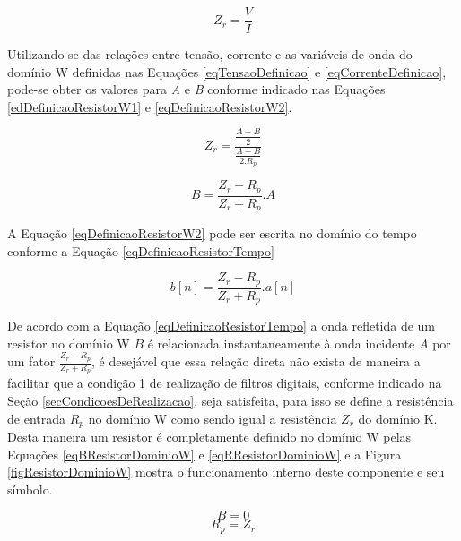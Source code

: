 	\begin{equation}
		\label{eqDefinicaoResistor}
		Z_r = \frac{V}{I}
	\end{equation}
	
	Utilizando-se das relações entre tensão, corrente e as variáveis de onda do domínio W definidas nas Equações \ref{eqTensaoDefinicao} e \ref{eqCorrenteDefinicao}, pode-se obter os valores para \textit{A} e \textit{B} conforme indicado nas Equações \ref{edDefinicaoResistorW1} e \ref{eqDefinicaoResistorW2}.
	
	\begin{equation}
		\label{edDefinicaoResistorW1}
		Z_r = \frac{\frac{A+B}{2}}{\frac{A-B}{2.R_p}}
	\end{equation}  
	
	\begin{equation}
		\label{eqDefinicaoResistorW2}
		B = \frac{Z_r-R_p}{Z_r+R_p}.A
	\end{equation}
	
	A Equação \ref{eqDefinicaoResistorW2} pode ser escrita no domínio do tempo conforme a Equação \ref{eqDefinicaoResistorTempo}
	
	\begin{equation}
		\label{eqDefinicaoResistorTempo}
		b[n] = \frac{Z_r-R_p}{Z_r+R_p}.a[n]
	\end{equation}
	
	De acordo com a Equação \ref{eqDefinicaoResistorTempo} a onda refletida de um resistor no domínio W $B$ é relacionada instantaneamente à onda incidente $A$ por um fator $\frac{Z_r-R_p}{Z_r+R_p}$, é desejável que essa relação direta não exista de maneira a facilitar que a condição 1 de realização de filtros digitais, conforme indicado na Seção \ref{secCondicoesDeRealizacao}, seja satisfeita, para isso se define a resistência de entrada $R_p$ no domínio W como sendo igual a resistência $Z_r$ do domínio K. Desta maneira um resistor é completamente definido no domínio W pelas Equações \ref{eqBResistorDominioW} e \ref{eqRResistorDominioW} e a Figura \ref{figResistorDominioW} mostra o funcionamento interno deste componente e seu símbolo.
	
	\begin{equation}
		\label{eqBResistorDominioW}
		B = 0
	\end{equation}   
	\begin{equation}
		\label{eqRResistorDominioW}
		R_p = Z_r
	\end{equation}
	
